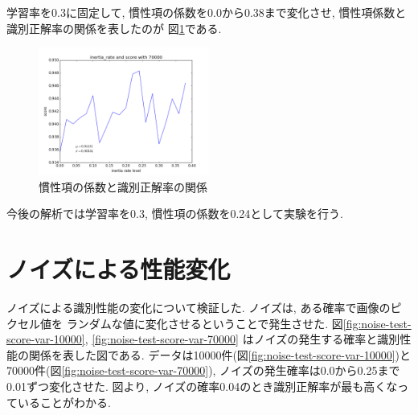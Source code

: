 \documentclass[10pt]{jarticle}
\begin{document}
学習率を0.3に固定して, 慣性項の係数を0.0から0.38まで変化させ,
慣性項係数と識別正解率の関係を表したのが
図\ref{fig:inertia-rate-score-var}である. 
\begin{figure}[htbp]
  \centering
  \includegraphics[width=0.5\textwidth]{assets/img/inertia_rate_test_mnist_70000.pdf}
  \caption{慣性項の係数と識別正解率の関係}
  \label{fig:inertia-rate-score-var}
\end{figure}

今後の解析では学習率を0.3, 慣性項の係数を0.24として実験を行う.

\section{ノイズによる性能変化}
ノイズによる識別性能の変化について検証した. 
ノイズは, ある確率で画像のピクセル値を
ランダムな値に変化させるということで発生させた. 
図\ref{fig:noise-test-score-var-10000}, 
\ref{fig:noise-test-score-var-70000}
はノイズの発生する確率と識別性能の関係を表した図である. 
データは10000件(図\ref{fig:noise-test-score-var-10000})と
70000件(図\ref{fig:noise-test-score-var-70000}), 
ノイズの発生確率は0.0から0.25まで0.01ずつ変化させた. 
図より, ノイズの確率0.04のとき識別正解率が最も高くなっていることがわかる. 
\end{document}
